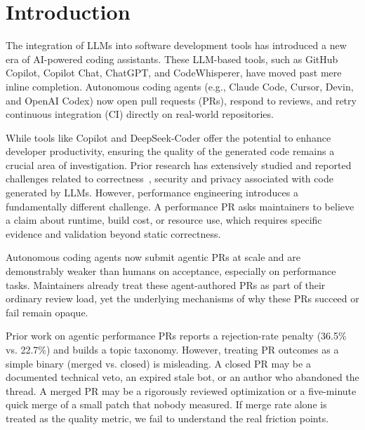 \section{Introduction} \label{sec:intro}
\label{intro}

The integration of LLMs into software development tools has introduced a new era of AI-powered coding assistants. These LLM-based tools, such as GitHub Copilot, Copilot Chat, ChatGPT, and CodeWhisperer, have moved past mere inline completion. Autonomous coding agents (e.g., Claude Code, Cursor, Devin, and OpenAI Codex) now open pull requests (PRs), respond to reviews, and retry continuous integration (CI) directly on real-world repositories.

While tools like Copilot and DeepSeek-Coder offer the potential to enhance developer productivity, ensuring the quality of the generated code remains a crucial area of investigation. Prior research has extensively studied and reported challenges related to correctness~\citep{DBLP:conf/msr/NguyenN22,wang2025understandingcharacteristicscodegeneration}, security and privacy associated with code generated by LLMs. However, performance engineering introduces a fundamentally different challenge. A performance PR asks maintainers to believe a claim about runtime, build cost, or resource use, which requires specific evidence and validation beyond static correctness.

Autonomous coding agents now submit agentic PRs at scale and are demonstrably weaker than humans on acceptance, especially on performance tasks. Maintainers already treat these agent-authored PRs as part of their ordinary review load, yet the underlying mechanisms of why these PRs succeed or fail remain opaque.

Prior work on agentic performance PRs reports a rejection-rate penalty (36.5\% vs. 22.7\%) and builds a topic taxonomy. However, treating PR outcomes as a simple binary (merged vs. closed) is misleading. A closed PR may be a documented technical veto, an expired stale bot, or an author who abandoned the thread. A merged PR may be a rigorously reviewed optimization or a five-minute quick merge of a small patch that nobody measured. If merge rate alone is treated as the quality metric, we fail to understand the real friction points.

